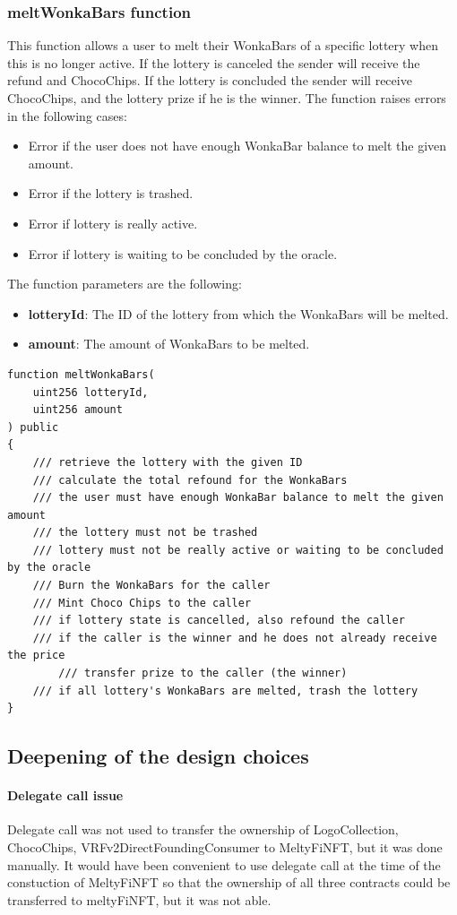 \subsubsection{meltWonkaBars function}
This function allows a user to melt their WonkaBars of a specific lottery when this is no longer active. If the lottery is canceled the sender will receive the refund and ChocoChips. If the lottery is concluded the sender will receive ChocoChips, and the lottery prize if he is the winner. The function raises errors in the following cases:
\begin{itemize}
    \item Error if the user does not have enough WonkaBar balance to melt the given amount.
    \item Error if the lottery is trashed.
    \item Error if lottery is really active.
    \item Error if lottery is waiting to be concluded by the oracle.
\end{itemize}
The function parameters are the following:
\begin{itemize}
    \item \textbf{lotteryId}: The ID of the lottery from which the WonkaBars will be melted.
    \item \textbf{amount}: The amount of WonkaBars to be melted.
\end{itemize}
\begin{verbatim}
function meltWonkaBars(
    uint256 lotteryId, 
    uint256 amount
) public 
{
    /// retrieve the lottery with the given ID
    /// calculate the total refound for the WonkaBars
    /// the user must have enough WonkaBar balance to melt the given amount
    /// the lottery must not be trashed
    /// lottery must not be really active or waiting to be concluded by the oracle
    /// Burn the WonkaBars for the caller
    /// Mint Choco Chips to the caller
    /// if lottery state is cancelled, also refound the caller
    /// if the caller is the winner and he does not already receive the price
        /// transfer prize to the caller (the winner)
    /// if all lottery's WonkaBars are melted, trash the lottery
}
\end{verbatim}


\subsection{Deepening of the design choices}

\paragraph{Delegate call issue}
Delegate call was not used to transfer the ownership of LogoCollection, ChocoChips, VRFv2DirectFoundingConsumer to MeltyFiNFT, but it was done manually. It would have been convenient to use delegate call at the time of the constuction of MeltyFiNFT so that the ownership of all three contracts could be transferred to meltyFiNFT, but it was not able. 

